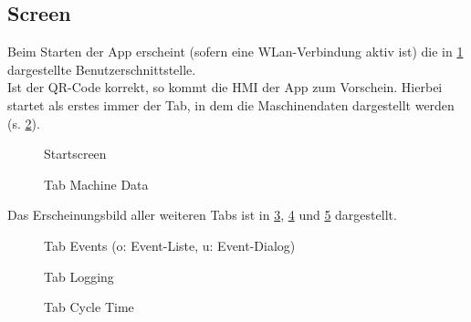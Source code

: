\subsection{Screen}
Beim Starten der App erscheint (sofern eine WLan-Verbindung aktiv ist) die in 
\ref{fig:startScreen} dargestellte Benutzerschnittstelle.\\
Ist der QR-Code korrekt, so kommt die HMI der App zum Vorschein. Hierbei 
startet als erstes immer der Tab, in dem die Maschinendaten dargestellt werden 
(s. \ref{fig:tabMachineData}).
\newpage
\begin{figure}[H]
	\centering
	\caption[Startscreen]{Startscreen}
	\label{fig:startScreen}
\end{figure}

\begin{figure}[H]
	\centering
	\caption[Tab Machine Data]{Tab Machine Data}
	\label{fig:tabMachineData}
\end{figure}

Das Erscheinungsbild aller weiteren Tabs ist in \ref{fig:tabEvents}, 
\ref{fig:tabLogging} und \ref{fig:tabCycleTime} dargestellt.

\begin{figure}[H]
	\centering
	\caption[Tab Events]{Tab Events (o: Event-Liste, u: Event-Dialog)}
	\label{fig:tabEvents}
\end{figure}

\begin{figure}[H]
	\centering
	\caption[Tab Logging]{Tab Logging}
	\label{fig:tabLogging}
\end{figure}

\begin{figure}[H]
	\centering
	\caption[Tab Cycle Time]{Tab Cycle Time}
	\label{fig:tabCycleTime}
\end{figure}